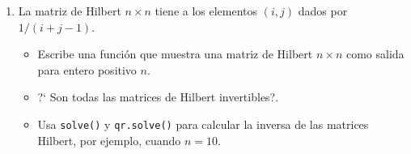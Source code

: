 \documentclass{article}\usepackage[]{graphicx}\usepackage[]{color}
\begin{document}
\begin{enumerate}
\item La matriz de Hilbert $n \times n$ tiene a los elementos $(i,j)$ dados por $1/(i + j-1)$.
\begin{itemize}
\item Escribe una funci\'on que muestra una matriz de Hilbert $n \times n$ como salida para entero positivo $n$.
\item ?` Son todas las matrices de Hilbert invertibles?.
\item Usa \texttt{solve()} y \texttt{qr.solve()} para calcular la inversa de las matrices Hilbert, por ejemplo, cuando $n = 10$.
\end{itemize}
\end{enumerate}
\end{document}
